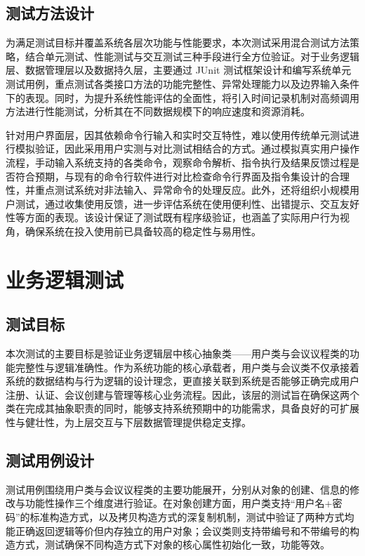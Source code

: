 \documentclass[a4paper, twoside, utf8]{ctexart}
\begin{document}
    \subsection{测试方法设计}

    为满足测试目标并覆盖系统各层次功能与性能要求，本次测试采用混合测试方法策略，结合单元测试、性能测试与交互测试三种手段进行全方位验证。对于业务逻辑层、数据管理层以及数据持久层，主要通过 JUnit 测试框架设计和编写系统单元测试用例，重点测试各类接口方法的功能完整性、异常处理能力以及边界输入条件下的表现。同时，为提升系统性能评估的全面性，将引入时间记录机制对高频调用方法进行性能测试，分析其在不同数据规模下的响应速度和资源消耗。

    针对用户界面层，因其依赖命令行输入和实时交互特性，难以使用传统单元测试进行模拟验证，因此采用用户实测与对比测试相结合的方式。通过模拟真实用户操作流程，手动输入系统支持的各类命令，观察命令解析、指令执行及结果反馈过程是否符合预期，与现有的命令行软件进行对比检查命令行界面及指令集设计的合理性，并重点测试系统对非法输入、异常命令的处理反应。此外，还将组织小规模用户测试，通过收集使用反馈，进一步评估系统在使用便利性、出错提示、交互友好性等方面的表现。该设计保证了测试既有程序级验证，也涵盖了实际用户行为视角，确保系统在投入使用前已具备较高的稳定性与易用性。

    \section{业务逻辑测试}

    \subsection{测试目标}

    本次测试的主要目标是验证业务逻辑层中核心抽象类——用户类与会议议程类的功能完整性与逻辑准确性。作为系统功能的核心承载者，用户类与会议类不仅承接着系统的数据结构与行为逻辑的设计理念，更直接关联到系统是否能够正确完成用户注册、认证、会议创建与管理等核心业务流程。因此，该层的测试旨在确保这两个类在完成其抽象职责的同时，能够支持系统预期中的功能需求，具备良好的可扩展性与健壮性，为上层交互与下层数据管理提供稳定支撑。

    \subsection{测试用例设计}

    测试用例围绕用户类与会议议程类的主要功能展开，分别从对象的创建、信息的修改与功能性操作三个维度进行验证。在对象创建方面，用户类支持“用户名+密码”的标准构造方式，以及拷贝构造方式的深复制机制，测试中验证了两种方式均能正确返回逻辑等价但内存独立的用户对象；会议类则支持带编号和不带编号的构造方式，测试确保不同构造方式下对象的核心属性初始化一致，功能等效。
\end{document}

